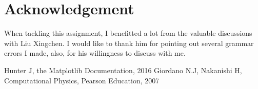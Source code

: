 \documentclass[10pt,a4paper]{article}
\begin{document}
    \section*{Acknowledgement}
    When tackling this assignment, I benefitted a lot from the valuable discussions with Liu Xingchen. I would like to thank him for pointing out several grammar errors I made, also, for his willingness to discuss with me.
    
    \begin{thebibliography}{99}
    	\bibitem{}Hunter J, the Matplotlib Documentation, 2016
    	\bibitem{}Giordano N.J, Nakanishi H, Computational Physics, Pearson Education, 2007
    \end{thebibliography} 
\end{document}
